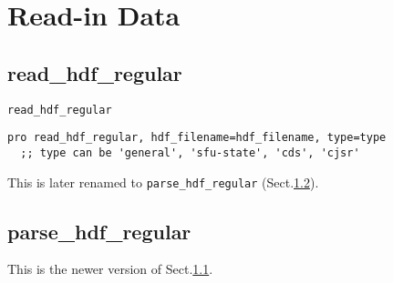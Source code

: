 \section{Read-in Data}

\subsection{read\_hdf\_regular}
\label{sec:read_hdf_regular}

\verb!read_hdf_regular! 
\begin{verbatim}
pro read_hdf_regular, hdf_filename=hdf_filename, type=type                                                                                                                                                 
  ;; type can be 'general', 'sfu-state', 'cds', 'cjsr'    
\end{verbatim}

This is later renamed to \verb!parse_hdf_regular!
(Sect.\ref{sec:parse_hdf_regular}).

\subsection{parse\_hdf\_regular}
\label{sec:parse_hdf_regular}

This is the newer version of Sect.\ref{sec:read_hdf_regular}.

